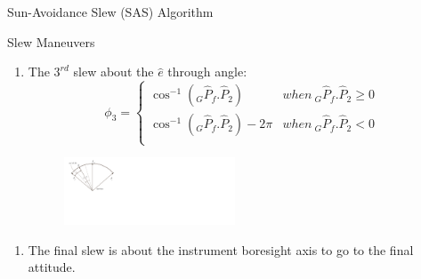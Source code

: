 \documentclass{beamer}
\begin{document}
\begin{frame}{Sun-Avoidance Slew (SAS) Algorithm}
\begin{block}{Slew Maneuvers}
\begin{enumerate}[3]
\item The $3^{rd}$ slew about the $\hat{e}$ through angle:
 \begin{equation}
 \phi_3=\left\{
                \begin{array}{ll}
                  \cos^{-1}(_G\hat{P}_f.\hat{P}_2)& when\  _G\hat{P}_f.\hat{P}_2\geq 0\\
                 \cos^{-1}(_G\hat{P}_f.\hat{P}_2)-2\pi& when\ _G\hat{P}_f.\hat{P}_2<0\\
                \end{array}
              \right.
 \end{equation}
\begin{figure}
\includegraphics[width=2in]{./Figures/SVAS_4r}
\end{figure}
\end{enumerate}
\begin{enumerate}[4]
\item The final slew is about the instrument boresight axis to go to the final attitude. 
\end{enumerate}
\end{block}
\end{frame}
%
%
\end{document}
